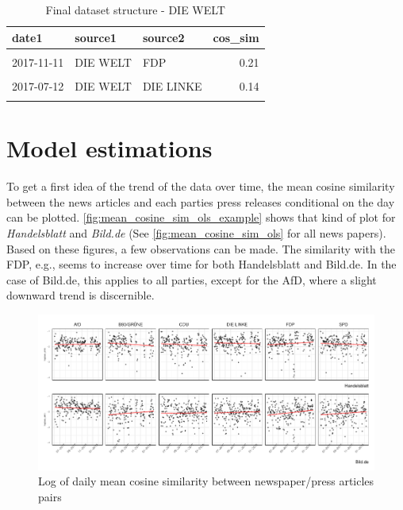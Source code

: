 \documentclass[
]{article}
\begin{document}
\begin{table}[H]

\caption{\label{tab:Dataset structure final}Final dataset structure - DIE WELT \label{table:dataset_structure_final}}
\centering
\fontsize{7}{9}\selectfont
\begin{tabular}[t]{lllr}
\toprule
date1 & source1 & source2 & cos\_sim\\
\midrule
\cellcolor{gray!6}{2017-07-29} & \cellcolor{gray!6}{DIE WELT} & \cellcolor{gray!6}{CDU} & \cellcolor{gray!6}{0.07}\\
2017-11-11 & DIE WELT & FDP & 0.21\\
\cellcolor{gray!6}{2017-08-24} & \cellcolor{gray!6}{DIE WELT} & \cellcolor{gray!6}{FDP} & \cellcolor{gray!6}{0.13}\\
2017-07-12 & DIE WELT & DIE LINKE & 0.14\\
\cellcolor{gray!6}{2017-09-04} & \cellcolor{gray!6}{DIE WELT} & \cellcolor{gray!6}{DIE LINKE} & \cellcolor{gray!6}{0.07}\\
\bottomrule
\end{tabular}
\end{table}

\hypertarget{model-estimations}{%
\section{Model estimations}\label{model-estimations}}

To get a first idea of the trend of the data over time, the mean cosine
similarity between the news articles and each parties press releases
conditional on the day can be plotted.
\autoref{fig:mean_cosine_sim_ols_example} shows that kind of plot for
\emph{Handelsblatt} and \emph{Bild.de} (See
\autoref{fig:mean_cosine_sim_ols} for all news papers). Based on these
figures, a few observations can be made. The similarity with the FDP,
e.g., seems to increase over time for both Handelsblatt and Bild.de. In
the case of Bild.de, this applies to all parties, except for the AfD,
where a slight downward trend is discernible.

\begin{figure}

{\centering \includegraphics[width=0.9\linewidth]{main_text_files/figure-latex/Daily mean cosine similarity - example-1} 

}

\caption{Log of daily mean cosine similarity between newspaper/press articles pairs \label{fig:mean_cosine_sim_ols_example}}\label{fig:Daily mean cosine similarity - example}
\end{figure}
\end{document}
